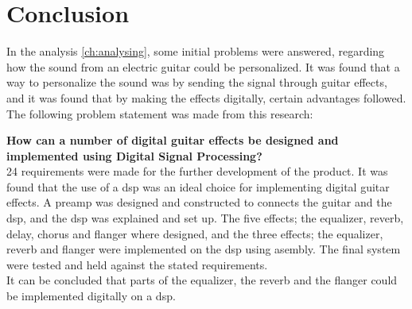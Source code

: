 \section{Conclusion}\label{sec:conclusion}

In the analysis \autoref{ch:analysing}, some initial problems were answered, regarding how the sound from an electric guitar could be personalized. It was found that a way to personalize the sound was by sending the signal through guitar effects, and it was found that by making the effects digitally, certain advantages followed. The following problem statement was made from this research:

\textbf{How can a number of digital guitar effects be designed and implemented using Digital Signal Processing?} \\

24 requirements were made for the further development of the product. 
It was found that the use of a \gls{dsp} was an ideal choice for implementing digital guitar effects. A \gls{preamp} was designed and constructed to connects the guitar and the \gls{dsp}, and the \gls{dsp} was explained and set up. The five effects; the equalizer, \gls{reverb}, delay, chorus and flanger where designed, and the three effects; the equalizer, \gls{reverb} and flanger were implemented on the \gls{dsp} using asembly.
The final system were tested and held against the stated requirements. \\

It can be concluded that parts of the equalizer, the \gls{reverb} and the flanger could be implemented digitally on a \gls{dsp}.  


